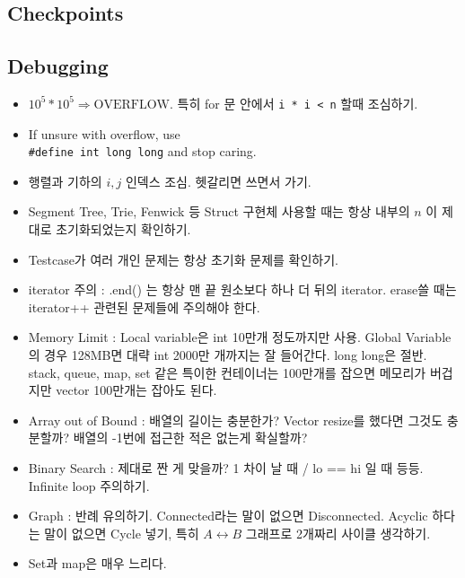 \documentclass[landscape,8pt]{article}
\begin{document}
\begin{multicols}{2}
\newpage
\section{Checkpoints}
  \subsection{Debugging}
\begin{itemize}
  \item $10^5 * 10^5 \Rightarrow \text{OVERFLOW}$. 특히 for 문 안에서 \texttt{i * i < n} 할때 조심하기.
  \item If unsure with overflow, use \\
  \texttt{\#define int long long} and stop caring.
  \item 행렬과 기하의 $i, j$ 인덱스 조심. 헷갈리면 쓰면서 가기.
  \item Segment Tree, Trie, Fenwick 등 Struct 구현체 사용할 때는 항상 내부의 $n$ 이 제대로 초기화되었는지 확인하기.
  \item Testcase가 여러 개인 문제는 항상 초기화 문제를 확인하기.
  \item iterator 주의 : .end() 는 항상 맨 끝 원소보다 하나 더 뒤의 iterator. erase쓸 때는 iterator++ 관련된 문제들에 주의해야 한다.
  \item Memory Limit : Local variable은 int 10만개 정도까지만 사용. Global Variable의 경우 128MB면 대략 int 2000만 개까지는 잘 들어간다. long long은 절반. stack, queue, map, set 같은 특이한 컨테이너는 100만개를 잡으면 메모리가 버겁지만 vector 100만개는 잡아도 된다.
  \item Array out of Bound : 배열의 길이는 충분한가? Vector resize를 했다면 그것도 충분할까? 배열의 -1번에 접근한 적은 없는게 확실할까?
  \item Binary Search : 제대로 짠 게 맞을까? 1 차이 날 때 / lo == hi 일 때 등등. Infinite loop 주의하기.
  \item Graph : 반례 유의하기. Connected라는 말이 없으면 Disconnected. Acyclic 하다는 말이 없으면 Cycle 넣기, 특히 $A \leftrightarrow B$ 그래프로 2개짜리 사이클 생각하기.
  \item Set과 map은 매우 느리다.
\end{itemize}

\end{multicols}
\end{document}
